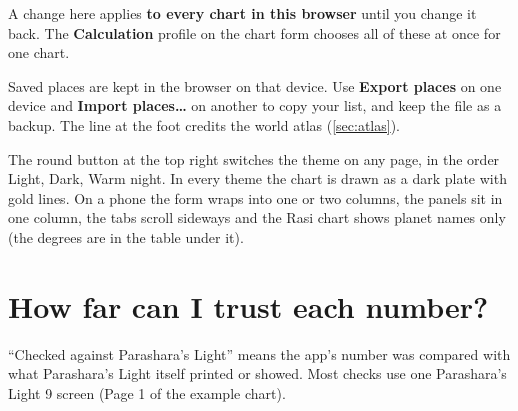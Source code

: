 \documentclass[11pt, a4paper]{article}
\newcommand{\shot}[1]{}
\newcommand{\PL}{Parashara's Light}
\newcommand{\ui}[1]{\textbf{\textsf{#1}}}   %
\begin{document}
\begin{warnbox}\kpit A change here applies \textbf{to every chart in this browser} until you change it
back. The \ui{Calculation} profile on the chart form chooses all of these at once for one chart.\end{warnbox}

\shot{seplaces}

Saved places are kept in the browser on that device. Use \ui{Export places} on one device and
\ui{Import places…} on another to copy your list, and keep the file as a backup. The line at the foot
credits the world atlas (\autoref{sec:atlas}).

\shot{selook}

The round button at the top right switches the theme on any page, in the order Light, Dark, Warm night.
In every theme the chart is drawn as a dark plate with gold lines. On a phone the form wraps into one or
two columns, the panels sit in one column, the tabs scroll sideways and the Rasi chart shows planet names
only (the degrees are in the table under it).

\section{How far can I trust each number?}
\label{sec:trust}
``Checked against \PL{}'' means the app's number was compared with what \PL{} itself printed or showed.
Most checks use one \PL{} 9 screen (Page 1 of the example chart).
\end{document}
